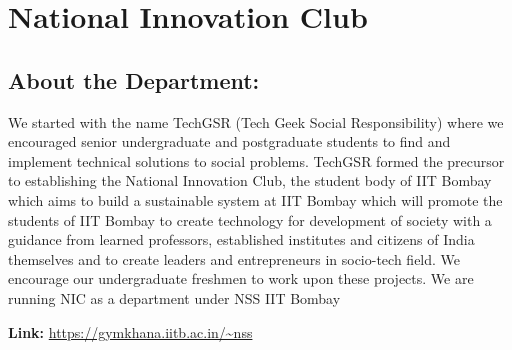 \chapter*{National Innovation Club}

\section*{ About the Department:}   We started with the name TechGSR (Tech Geek Social Responsibility) where we encouraged senior undergraduate and postgraduate students to find and implement
technical solutions to social problems.
TechGSR formed the precursor to establishing the National Innovation Club, the
student body of IIT Bombay which aims to build a sustainable system at IIT Bombay
which will promote the students of IIT Bombay to create technology for development of
society with a guidance from learned professors, established institutes and citizens of
India themselves and to create leaders and entrepreneurs in socio-tech field. We
encourage our undergraduate freshmen to work upon these projects. We are running
NIC as a department under NSS IIT Bombay

\vspace*{0.5cm}
\noindent \textbf{Link:} \url{https://gymkhana.iitb.ac.in/~nss} \\

